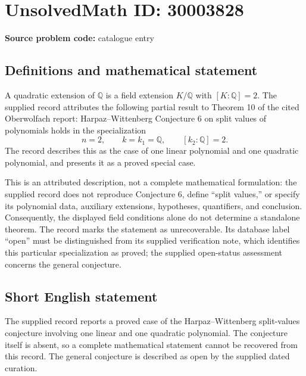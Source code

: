 \documentclass[11pt]{article}
\newcommand{\Q}{\mathbb{Q}}
\begin{document}
\section*{UnsolvedMath ID: 30003828}
\textbf{Source problem code:} catalogue entry
\subsection{Definitions and mathematical statement}
A quadratic extension of \(\Q\) is a field extension \(K/\Q\) with \([K:\Q]=2\). The supplied record attributes the following partial result to Theorem 10 of the cited Oberwolfach report: Harpaz--Wittenberg Conjecture 6 on split values of polynomials holds in the specialization
\[
 n=2,\qquad k=k_1=\Q,\qquad [k_2:\Q]=2.
\]
The record describes this as the case of one linear polynomial and one quadratic polynomial, and presents it as a proved special case.

This is an attributed description, not a complete mathematical formulation: the supplied record does not reproduce Conjecture 6, define ``split values,'' or specify its polynomial data, auxiliary extensions, hypotheses, quantifiers, and conclusion. Consequently, the displayed field conditions alone do not determine a standalone theorem. The record marks the statement as unrecoverable. Its database label ``open'' must be distinguished from its supplied verification note, which identifies this particular specialization as proved; the supplied open-status assessment concerns the general conjecture.
\subsection{Short English statement}
The supplied record reports a proved case of the Harpaz--Wittenberg split-values conjecture involving one linear and one quadratic polynomial. The conjecture itself is absent, so a complete mathematical statement cannot be recovered from this record. The general conjecture is described as open by the supplied dated curation.
\end{document}
